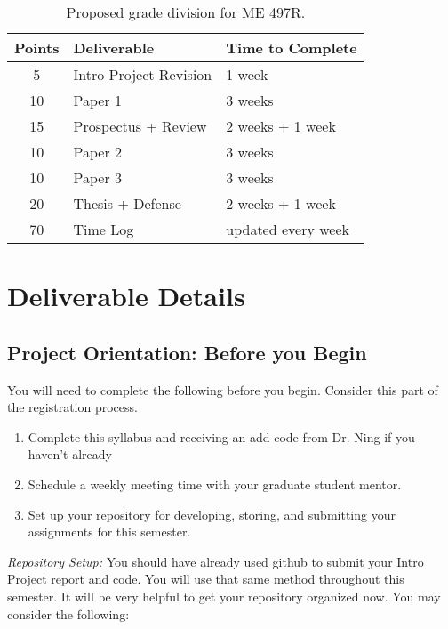 \documentclass[12pt]{article}
\begin{document}
\begin{table}[h!]
	\caption{Proposed grade division for ME 497R.}
	\label{tab:rubric}
	\renewcommand{\arraystretch}{1.2}
	\vspace{1em}
	\begin{tabular}{c|l|l}
		\textbf{Points} & \textbf{Deliverable} & \textbf{Time to Complete}\\ 
		\hline
		5 & Intro Project Revision & 1 week\\
		10 & Paper 1 & 3 weeks \\
		15 & Prospectus + Review & 2 weeks + 1 week\\
		10 & Paper 2 & 3 weeks\\
		10 & Paper 3 & 3 weeks\\
		20 & Thesis + Defense& 2 weeks + 1 week \\
		70 & Time Log & updated every week		
	\end{tabular}
\end{table}





\section{Deliverable Details}
\label{sec:deliverables}


\subsection{Project Orientation: Before you Begin}
\label{ssec:orientation}

You will need to complete the following before you begin.  Consider this part of the registration process.

\begin{enumerate}
	\item Complete this syllabus and receiving an add-code from Dr. Ning if you haven't already
	\item Schedule a weekly meeting time with your graduate student mentor.
	\item Set up your repository for developing, storing, and submitting your assignments for this semester. 
\end{enumerate}

\textit{Repository Setup:} You should have already used github to submit your Intro Project report and code. You will use that same method throughout this semester.
It will be very helpful to get your repository organized now.
You may consider the following:
\end{document}
